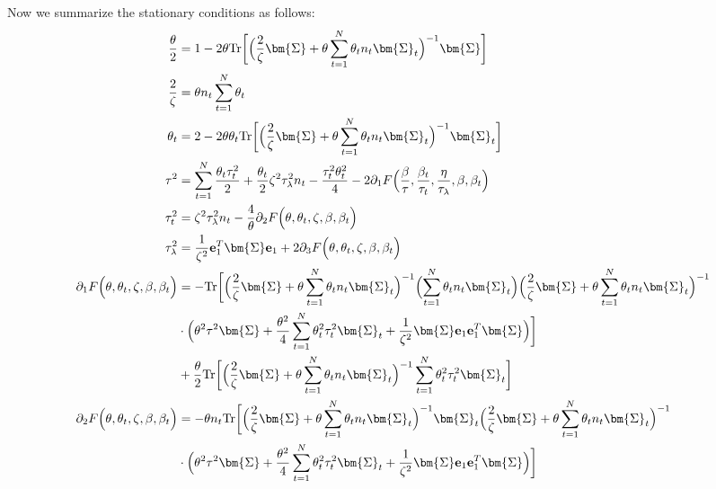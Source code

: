\documentclass[final]{l4dc2026}
\newcommand{\bSigma}{\bm{\Sigma}}
\newcommand{\be}{\mathbf{e}}
\newcommand{\tr}{\text{Tr}}
\begin{document}
Now we summarize the stationary conditions as follows:
\begin{align}\label{eq: thm_arbN_eqns}
    \frac{\theta}{2}  &= 1 - 2 \theta \tr \biggl[\Bigl(\frac{2}{\zeta}\bSigma+\theta\sum_{t=1}^N \theta_t n_t \bSigma_t \Bigr)^{-1} \bSigma \biggr] \nonumber\\
    \frac{2}{\zeta} &= \theta n_t \sum_{t=1}^N \theta_t \nonumber\\
    \theta_t &= 2 - 2 \theta \theta_t \tr \biggl[\Bigl(\frac{2}{\zeta}\bSigma+\theta\sum_{t=1}^N \theta_t n_t \bSigma_t \Bigr)^{-1} \bSigma_t\biggr] \nonumber\\
    \tau^2 &= \sum_{t=1}^N \frac{\theta_t \tau^2_t}{2} + \frac{\theta_t}{2} \zeta^2 \tau_{\lambda}^2 n_t - \frac{\tau_t^2 \theta_t^2}{4} - 2 \partial_1  F\Bigl(\frac{\beta}{\tau}, \frac{\beta_t}{\tau_t}, \frac{\eta}{\tau_{\lambda}}, \beta, \beta_t\Bigr) \nonumber\\
    \tau_t^2 &= \zeta^2 \tau_{\lambda}^2 n_t - \frac{4}{\theta} \partial_2 F\Bigl(\theta, \theta_t, \zeta, \beta, \beta_t\Bigr)\nonumber \\
    \tau^2_{\lambda} &=\frac{1}{\zeta^2} \be_1^T \bSigma \be_1 + 2\partial_3 F\Bigl(\theta, \theta_t, \zeta, \beta, \beta_t\Bigr) \nonumber\\
    \partial_1  F\Bigl(\theta, \theta_t, \zeta, \beta, \beta_t\Bigr) &= -\tr \biggl[\Bigl(\frac{2}{\zeta}\bSigma+\theta\sum_{t=1}^N \theta_t n_t \bSigma_t \Bigr)^{-1} \Bigl(\sum_{t=1}^N \theta_t n_t \bSigma_t \Bigr) \Bigl(\frac{2}{\zeta}\bSigma+\theta\sum_{t=1}^N \theta_t n_t \bSigma_t \Bigr)^{-1}  \nonumber\\ 
    & \cdot \Bigl(\theta^2 \tau^2 \bSigma + \frac{\theta^2}{4} \sum_{t=1}^N \theta^2_t \tau_t^2  \bSigma_t  +\frac{1}{\zeta^2}\bSigma \be_1 \be_1^T \bSigma\Bigr) \biggr] \nonumber \\
    &+ \frac{\theta}{2} \tr\biggl[ \Bigl(\frac{2}{\zeta}\bSigma+\theta\sum_{t=1}^N \theta_t n_t \bSigma_t \Bigr)^{-1}  \sum_{t=1}^N \theta^2_t \tau_t^2  \bSigma_t\biggr] \nonumber\\
     \partial_2 F\Bigl(\theta, \theta_t, \zeta, \beta, \beta_t\Bigr) &= - \theta n_t\tr \biggl[\Bigl(\frac{2}{\zeta}\bSigma+\theta\sum_{t=1}^N \theta_t n_t \bSigma_t \Bigr)^{-1} \bSigma_t  \Bigl(\frac{2}{\zeta}\bSigma+\theta\sum_{t=1}^N \theta_t n_t \bSigma_t \Bigr)^{-1} \nonumber\\
     &\cdot \Bigl(\theta^2 \tau^2 \bSigma + \frac{\theta^2}{4} \sum_{t=1}^N \theta^2_t \tau_t^2  \bSigma_t  + \frac{1}{\zeta^2}\bSigma \be_1 \be_1^T \bSigma\Bigr) \biggr]\nonumber\\

\end{align}
\end{document}
